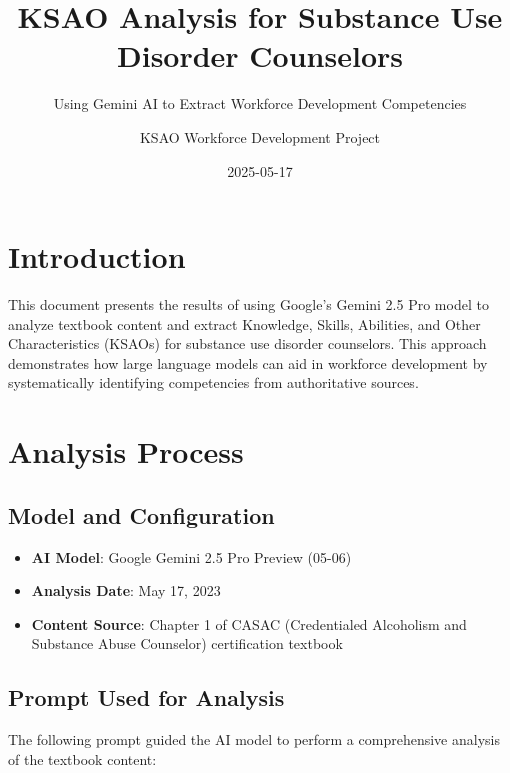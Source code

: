 \documentclass[
  letterpaper,
  DIV=11,
  numbers=noendperiod]{scrartcl}
\title{KSAO Analysis for Substance Use Disorder Counselors}
\subtitle{Using Gemini AI to Extract Workforce Development Competencies}
\author{KSAO Workforce Development Project}
\date{2025-05-17}
\providecommand{\tightlist}{%
  \setlength{\itemsep}{0pt}\setlength{\parskip}{0pt}}
\renewcommand*\contentsname{Table of contents}
\newcommand\contentsname{Table of contents}
\begin{document}
\maketitle

\renewcommand*\contentsname{Table of contents}
{
\hypersetup{linkcolor=}
\setcounter{tocdepth}{3}
\tableofcontents
}

\section{Introduction}\label{introduction}

This document presents the results of using Google's Gemini 2.5 Pro
model to analyze textbook content and extract Knowledge, Skills,
Abilities, and Other Characteristics (KSAOs) for substance use disorder
counselors. This approach demonstrates how large language models can aid
in workforce development by systematically identifying competencies from
authoritative sources.

\section{Analysis Process}\label{analysis-process}

\subsection{Model and Configuration}\label{model-and-configuration}

\begin{itemize}
\tightlist
\item
  \textbf{AI Model}: Google Gemini 2.5 Pro Preview (05-06)
\item
  \textbf{Analysis Date}: May 17, 2023
\item
  \textbf{Content Source}: Chapter 1 of CASAC (Credentialed Alcoholism
  and Substance Abuse Counselor) certification textbook
\end{itemize}

\subsection{Prompt Used for Analysis}\label{prompt-used-for-analysis}

The following prompt guided the AI model to perform a comprehensive
analysis of the textbook content:
\end{document}
